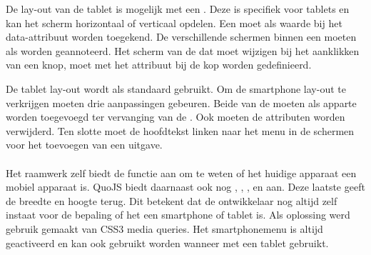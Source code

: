 De lay-out van de tablet is mogelijk met een .
Deze  is specifiek voor tablets en kan het scherm horizontaal of verticaal opdelen.
Een  moet als waarde bij het data-attribuut  worden toegekend.
De verschillende schermen binnen een  moeten als  worden geannoteerd.
Het scherm van de  dat moet wijzigen bij het aanklikken van een knop, moet met het  attribuut bij de kop worden gedefinieerd.

De tablet lay-out wordt als standaard gebruikt.
Om de smartphone lay-out te verkrijgen moeten drie aanpassingen gebeuren.
Beide  van de  moeten als apparte  worden toegevoegd ter vervanging van de .
Ook moeten de  attributen worden verwijderd.
Ten slotte moet de hoofdtekst linken naar het menu in de schermen voor het toevoegen van een uitgave.



\paragraph{\lungo}
Het raamwerk zelf biedt de functie  aan om te weten of het huidige apparaat een mobiel apparaat is.
QuoJS biedt daarnaast ook nog , , ,  en  aan.
Deze laatste geeft de breedte en hoogte terug.
Dit betekent dat de ontwikkelaar nog altijd zelf instaat voor de bepaling of het een smartphone of tablet is.
Als oplossing werd gebruik gemaakt van CSS3 media queries.
Het smartphonemenu is altijd geactiveerd en kan ook gebruikt worden wanneer met een tablet gebruikt.

